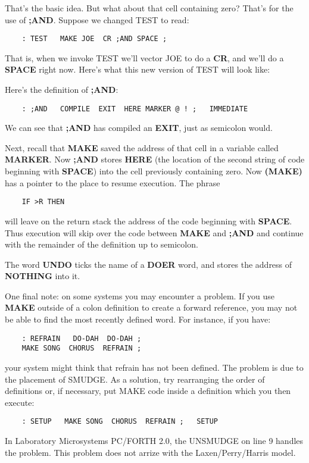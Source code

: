 That's the basic idea.  But what about that cell containing zero?  That's
for the use of {\bf ;AND}.  Suppose we changed TEST to read:

\begin{verbatim}
    : TEST   MAKE JOE  CR ;AND SPACE ;
\end{verbatim}
That is, when we invoke TEST we'll vector JOE to do a {\bf CR}, and we'll do a
{\bf SPACE} right now.  Here's what this new version of TEST will look like:

Here's the definition of {\bf ;AND}:
\begin{verbatim}
    : ;AND   COMPILE  EXIT  HERE MARKER @ ! ;   IMMEDIATE
\end{verbatim}
We can see that {\bf ;AND} has compiled an {\bf EXIT},
just as semicolon would.

Next, recall that {\bf MAKE} saved the address of that cell in a variable
called {\bf MARKER}.  Now {\bf ;AND} stores {\bf HERE} (the location of the second
string of code beginning with {\bf SPACE}) into the cell previously containing
zero.  Now {\bf (MAKE)} has a pointer to the place to resume execution.  The
phrase
\begin{verbatim}
    IF >R THEN
\end{verbatim}
will leave on the return stack the address of the code beginning with 
{\bf SPACE}.  Thus execution will skip over the code between {\bf MAKE} and 
{\bf ;AND} and continue with the remainder of the definition up to semicolon.

The word {\bf UNDO} ticks the name of a {\bf DOER} word, and stores the
address of {\bf NOTHING} into it.

One final note:  on some systems you may encounter a problem.  If
you use {\bf MAKE} outside of a colon definition to create a forward reference,
you may not be able to find the most recently defined word.  For instance,
if you have:
\begin{verbatim}
    : REFRAIN   DO-DAH  DO-DAH ;
    MAKE SONG  CHORUS  REFRAIN ;
\end{verbatim}
your system might think that refrain has not been defined.  The problem
is due to the placement of SMUDGE.  As a solution, try rearranging
the order of definitions or, if necessary, put MAKE code inside a 
definition which you then execute:
\begin{verbatim}
    : SETUP   MAKE SONG  CHORUS  REFRAIN ;   SETUP
\end{verbatim}
In Laboratory Microsystems PC/FORTH 2.0, the UNSMUDGE on line 9 
handles the problem.  This problem does not arrize with the Laxen/Perry/Harris
model.

